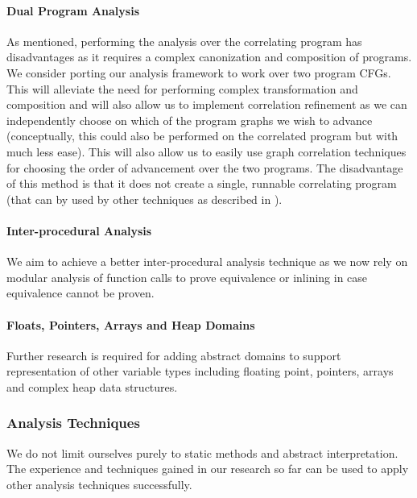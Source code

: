 \paragraph{Dual Program Analysis}
As mentioned, performing the analysis over the correlating program has disadvantages as it requires a complex canonization and composition of programs. We consider porting our analysis framework to work over two program CFGs. This will alleviate the need for performing complex transformation and composition and will also allow us to implement correlation refinement as we can independently choose on which of the program graphs we wish to advance (conceptually, this could also be performed on the correlated program but with much less ease). This will also allow us to easily use graph correlation techniques for choosing the order of advancement over the two programs. The disadvantage of this method is that it does not create a single, runnable correlating program (that can by used by other techniques as described in ).

\paragraph{Inter-procedural Analysis}
We aim to achieve a better inter-procedural analysis technique as we now rely on modular analysis of function calls to prove equivalence or inlining in case equivalence cannot be proven.

\paragraph{Floats, Pointers, Arrays and Heap Domains}
Further research is required for adding abstract domains to support representation of other variable types including floating point, pointers, arrays and complex heap data structures.


\subsubsection{Analysis Techniques}
We do not limit ourselves purely to static methods and abstract interpretation. The experience and techniques gained in our research so far can be used to apply other analysis techniques successfully.

